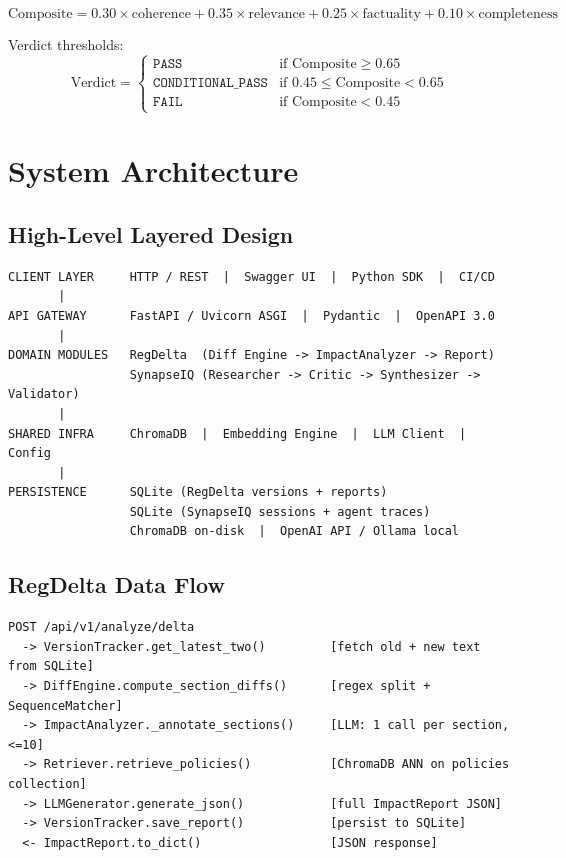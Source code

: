 \documentclass[12pt,letterpaper]{article}
\begin{document}
\begin{equation}
  \text{Composite} = 0.30 \times \text{coherence} + 0.35 \times \text{relevance}
                   + 0.25 \times \text{factuality} + 0.10 \times \text{completeness}
\end{equation}

Verdict thresholds:
\[
  \text{Verdict} =
  \begin{cases}
    \texttt{PASS}             & \text{if Composite} \geq 0.65 \\
    \texttt{CONDITIONAL\_PASS} & \text{if } 0.45 \leq \text{Composite} < 0.65 \\
    \texttt{FAIL}             & \text{if Composite} < 0.45
  \end{cases}
\]

\section{System Architecture}

\subsection{High-Level Layered Design}

\begin{lstlisting}[caption={DocuMind 5-layer system architecture}]
CLIENT LAYER     HTTP / REST  |  Swagger UI  |  Python SDK  |  CI/CD
       |
API GATEWAY      FastAPI / Uvicorn ASGI  |  Pydantic  |  OpenAPI 3.0
       |
DOMAIN MODULES   RegDelta  (Diff Engine -> ImpactAnalyzer -> Report)
                 SynapseIQ (Researcher -> Critic -> Synthesizer -> Validator)
       |
SHARED INFRA     ChromaDB  |  Embedding Engine  |  LLM Client  |  Config
       |
PERSISTENCE      SQLite (RegDelta versions + reports)
                 SQLite (SynapseIQ sessions + agent traces)
                 ChromaDB on-disk  |  OpenAI API / Ollama local
\end{lstlisting}

\subsection{RegDelta Data Flow}

\begin{lstlisting}[caption={RegDelta request lifecycle}]
POST /api/v1/analyze/delta
  -> VersionTracker.get_latest_two()         [fetch old + new text from SQLite]
  -> DiffEngine.compute_section_diffs()      [regex split + SequenceMatcher]
  -> ImpactAnalyzer._annotate_sections()     [LLM: 1 call per section, <=10]
  -> Retriever.retrieve_policies()           [ChromaDB ANN on policies collection]
  -> LLMGenerator.generate_json()            [full ImpactReport JSON]
  -> VersionTracker.save_report()            [persist to SQLite]
  <- ImpactReport.to_dict()                  [JSON response]
\end{lstlisting}
\end{document}
